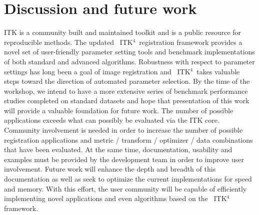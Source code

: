 \documentclass{frontiersSCNS}
\newcommand{\tk}{~ITK$^{\text{4}}$~}
\begin{document}
\section{Discussion and future work} 
ITK is a community built and maintained toolkit and is a public
resource for reproducible methods.  The updated \tk registration
framework provides a novel set of user-friendly parameter setting
tools and benchmark implementations of both standard and advanced
algorithms.  Robustness with respect to parameter settings has long
been a goal of image registration and \tk takes valuable steps toward
the direction of automated parameter selection.  By the time of the
workshop, we intend to have a more extensive series of benchmark performance studies
completed on standard datasets and hope that presentation of this work
will provide a valuable foundation for future work.  The number of
possible applications exceeds what can possibly be evaluated via the
ITK core.  Community involvement is needed in order to increase the
number of possible registration applications and metric / transform /
optimizer / data combinations that have been evaluated.  At the same
time, documentation, usability and examples must be provided by the
development team in order to improve user involvement.  Future work
will enhance the depth and breadth of this documentation as well as
seek to optimize the current implementations for speed and memory.
With this effort, the user community will be capable of efficiently
implementing novel applications and even algorithms based on the \tk
framework.
\end{document}
